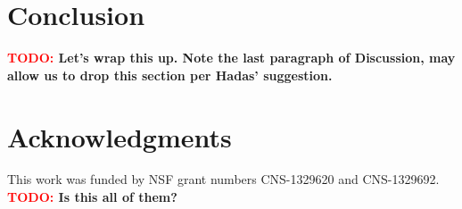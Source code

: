\documentclass[conference]{IEEEtran}
\newcommand{\TODO}[1]{ {\bf \textcolor{red}{TODO:} #1 }}
\begin{document}
\section{Conclusion} \label{sec:conclusion}
%
\TODO{Let's wrap this up. Note the last paragraph of Discussion, may allow us to drop this section per Hadas' suggestion.}

\section*{Acknowledgments}
%
This work was funded by NSF grant numbers CNS-1329620 and CNS-1329692.
\TODO{Is this all of them?}





\end{document}
